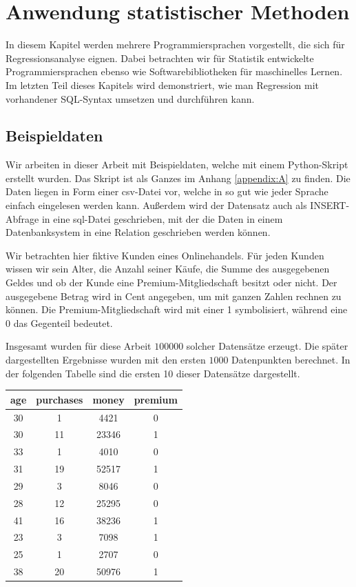 \chapter{Anwendung statistischer Methoden}
\label{chapter:3}

In diesem Kapitel werden mehrere Programmiersprachen vorgestellt, die sich für Regressionsanalyse eignen. Dabei betrachten wir für Statistik entwickelte Programmiersprachen ebenso wie Softwarebibliotheken für maschinelles Lernen. Im letzten Teil dieses Kapitels wird demonstriert, wie man Regression mit vorhandener SQL-Syntax umsetzen und durchführen kann.

\section{Beispieldaten}
\label{section:3:1}

Wir arbeiten in dieser Arbeit mit Beispieldaten, welche mit einem Python-Skript erstellt wurden. Das Skript ist als Ganzes im Anhang \ref{appendix:A} zu finden. Die Daten liegen in Form einer csv-Datei vor, welche in so gut wie jeder Sprache einfach eingelesen werden kann. Außerdem wird der Datensatz auch als INSERT-Abfrage in eine sql-Datei geschrieben, mit der die Daten in einem Datenbanksystem in eine Relation geschrieben werden können.

Wir betrachten hier fiktive Kunden eines Onlinehandels. Für jeden Kunden wissen wir sein Alter, die Anzahl seiner Käufe, die Summe des ausgegebenen Geldes und ob der Kunde eine Premium-Mitgliedschaft besitzt oder nicht. Der ausgegebene Betrag wird in Cent angegeben, um mit ganzen Zahlen rechnen zu können. Die Premium-Mitgliedschaft wird mit einer 1 symbolisiert, während eine 0 das Gegenteil bedeutet.

Insgesamt wurden für diese Arbeit $100000$ solcher Datensätze erzeugt. Die später dargestellten Ergebnisse wurden mit den ersten $1000$ Datenpunkten berechnet. In der folgenden Tabelle sind die ersten 10 dieser Datensätze dargestellt.

\begin{center}
  \begin{tabular}{|c|c|c|c|}\hline
    \textbf{age} & \textbf{purchases} & \textbf{money} & \textbf{premium} \\ \hline
    30 & 1 & 4421 & 0 \\ \hline
    30 & 11 & 23346 & 1 \\ \hline
    33 & 1 & 4010 & 0 \\ \hline
    31 & 19 & 52517 & 1 \\ \hline
    29 & 3 & 8046 & 0 \\ \hline
    28 & 12 & 25295 & 0 \\ \hline
    41 & 16 & 38236 & 1 \\ \hline
    23 & 3 & 7098 & 1 \\ \hline
    25 & 1 & 2707 & 0 \\ \hline
    38 & 20 & 50976 & 1 \\ \hline
  \end{tabular}
\end{center}

